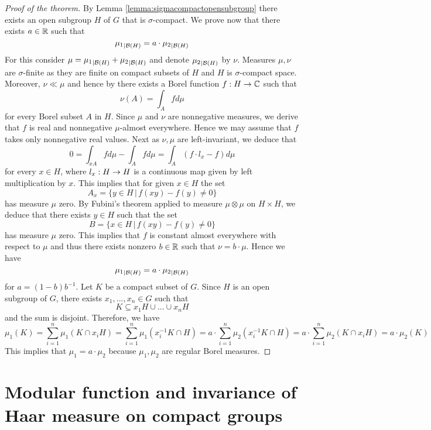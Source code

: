 \begin{proof}[Proof of the theorem]
By Lemma \ref{lemma:sigmacompactopensubgroup} there exists an open subgroup $H$ of $G$ that is $\sigma$-compact. We prove now that there exists $a\in {\mathbb R}$ such that
$${\mu_1}_{\mid {\mathcal B}(H)} = a\cdot {\mu_2}_{\mid {\mathcal B}(H)}$$
For this consider $\mu = {\mu_1}_{\mid {\mathcal B}(H)} + {\mu_2}_{\mid {\mathcal B}(H)}$ and denote ${\mu_2}_{\mid {\mathcal B}(H)}$ by $\nu$. Measures $\mu, \nu$ are $\sigma$-finite as they are finite on compact subsets of $H$ and $H$ is $\sigma$-compact space. Moreover, $\nu \ll \mu$ and hence by {\cite[Theorem 5.3]{RadonNikodymHahnJordanLebesguedecomposition}} there exists a Borel function $f:H\rightarrow {\mathbb C}$ such that
$$\nu(A) = \int_Afd\mu$$
for every Borel subset $A$ in $H$. Since $\mu$ and $\nu$ are nonnegative measures, we derive that $f$ is real and nonnegative $\mu$-almost everywhere. Hence we may assume that $f$ takes only nonnegative real values. Next as $\nu, \mu$ are left-invariant, we deduce that
$$0 = \int_{xA}fd\mu -\int_Afd\mu = \int_A\left(f\cdot l_x - f\right)d\mu$$
for every $x\in H$, where $l_x:H\rightarrow H$ is a continuous map given by left multiplication by $x$. This implies that for given $x\in H$ the set
$$A_x = \big\{y\in H\,\big|\,f(xy) - f(y) \neq 0\big\}$$
has measure $\mu$ zero. By Fubini's theorem applied to measure $\mu\otimes \mu$ on $H\times H$, we deduce that there exists $y\in H$ such that the set
$$B = \big\{x\in H\,\big|\,f(xy) -f(y) \neq 0\big\}$$
has measure $\mu$ zero. This implies that $f$ is constant almost everywhere with respect to $\mu$ and thus there exists nonzero $b\in {\mathbb R}$ such that $\nu = b\cdot \mu$. Hence we have
$${\mu_1}_{\mid {\mathcal B}(H)} = a\cdot {\mu_2}_{\mid {\mathcal B}(H)}$$
for $a = (1-b)b^{-1}$. Let $K$ be a compact subset of $G$. Since $H$ is an open subgroup of $G$, there exists $x_1,...,x_n\in G$ such that
$$K\subseteq x_1H\cup ...\cup x_nH$$
and the sum is disjoint. Therefore, we have
$$\mu_1(K) = \sum_{i=1}^n\mu_1\left(K\cap x_iH\right) = \sum_{i=1}^n\mu_1\left(x_i^{-1}K\cap H\right) =a\cdot \sum_{i=1}^n\mu_2\left(x_i^{-1}K\cap H\right) = a\cdot \sum_{i=1}^n\mu_2\left(K\cap x_iH\right) = a\cdot \mu_2(K)$$
This implies that $\mu_1 = a\cdot \mu_2$ because $\mu_1,\mu_2$ are regular Borel measures.
\end{proof}

\section{Modular function and invariance of Haar measure on compact groups}






\small



